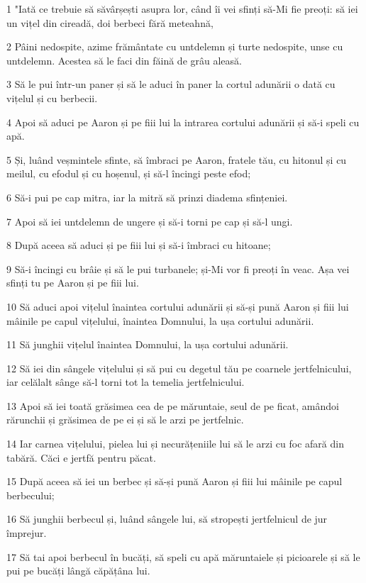 \par 1 "Iată ce trebuie să săvârșești asupra lor, când îi vei sfinți să-Mi fie preoți: să iei un vițel din cireadă, doi berbeci fără meteahnă,
\par 2 Pâini nedospite, azime frământate cu untdelemn și turte nedospite, unse cu untdelemn. Acestea să le faci din făină de grâu aleasă.
\par 3 Să le pui într-un paner și să le aduci în paner la cortul adunării o dată cu vițelul și cu berbecii.
\par 4 Apoi să aduci pe Aaron și pe fiii lui la intrarea cortului adunării și să-i speli cu apă.
\par 5 Și, luând veșmintele sfinte, să îmbraci pe Aaron, fratele tău, cu hitonul și cu meilul, cu efodul și cu hoșenul, și să-l încingi peste efod;
\par 6 Să-i pui pe cap mitra, iar la mitră să prinzi diadema sfințeniei.
\par 7 Apoi să iei untdelemn de ungere și să-i torni pe cap și să-l ungi.
\par 8 După aceea să aduci și pe fiii lui și să-i îmbraci cu hitoane;
\par 9 Să-i încingi cu brâie și să le pui turbanele; și-Mi vor fi preoți în veac. Așa vei sfinți tu pe Aaron și pe fiii lui.
\par 10 Să aduci apoi vițelul înaintea cortului adunării și să-și pună Aaron și fiii lui mâinile pe capul vițelului, înaintea Domnului, la ușa cortului adunării.
\par 11 Să junghii vițelul înaintea Domnului, la ușa cortului adunării.
\par 12 Să iei din sângele vițelului și să pui cu degetul tău pe coarnele jertfelnicului, iar celălalt sânge să-l torni tot la temelia jertfelnicului.
\par 13 Apoi să iei toată grăsimea cea de pe măruntaie, seul de pe ficat, amândoi rărunchii și grăsimea de pe ei și să le arzi pe jertfelnic.
\par 14 Iar carnea vițelului, pielea lui și necurățeniile lui să le arzi cu foc afară din tabără. Căci e jertfă pentru păcat.
\par 15 După aceea să iei un berbec și să-și pună Aaron și fiii lui mâinile pe capul berbecului;
\par 16 Să junghii berbecul și, luând sângele lui, să stropești jertfelnicul de jur împrejur.
\par 17 Să tai apoi berbecul în bucăți, să speli cu apă măruntaiele și picioarele și să le pui pe bucăți lângă căpățâna lui.
